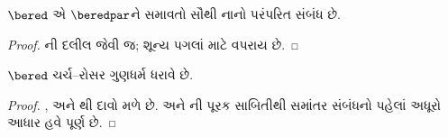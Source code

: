 \documentclass[../../../include/open-logic-section]{subfiles}
\begin{document}
\begin{lem}
  $\bered$ એ $\beredpar$ને સમાવતો સૌથી નાનો
  પરંપરિત સંબંધ છે.
\end{lem}

\begin{proof}
  ની દલીલ જેવી જ; શૂન્ય પગલાં
  માટે  વપરાય છે.
\end{proof}

\begin{thm}
  $\bered$ ચર્ચ--રોસર ગુણધર્મ ધરાવે છે.
\end{thm}

\begin{proof}
  ,  અને
  થી દાવો મળે છે.
   અને ની
  પૂરક સાબિતીથી સમાંતર સંબંધનો પહેલાં અધૂરો આધાર હવે પૂર્ણ છે.
\end{proof}
\end{document}
